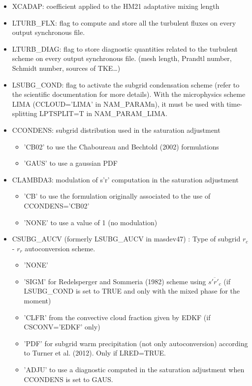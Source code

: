 \begin{itemize}
\item
{} 
XCADAP: coefficient applied to the HM21 adaptative mixing length

\item
{}
LTURB\_FLX: flag to compute and store all the turbulent fluxes
 on every output synchronous file.

\item
{}
LTURB\_DIAG: flag to  store diagnostic quantities related to the 
turbulent scheme  on every output synchronous file. (mesh length, Prandtl
number, Schmidt number, sources of TKE\ldots)

\item
{}
LSUBG\_COND: flag to activate the subgrid condensation scheme (refer to the scientific 
documentation for more details).  With the microphysics scheme LIMA (CCLOUD='LIMA' in NAM\_PARAMn), it must be used with time-splitting LPTSPLIT=T in NAM\_PARAM\_LIMA.

\item
{}
CCONDENS: subgrid distribution used in the saturation adjustment
\begin{itemize}
\item  'CB02' to use the Chaboureau and Bechtold (2002) formulations
\item 'GAUS' to use a gaussian PDF
\end{itemize}

\item
{}
CLAMBDA3: modulation of s'r' computation in the saturation adjustment
\begin{itemize}
\item 'CB' to use the formulation originally associated to the use of CCONDENS='CB02'
\item 'NONE' to use a value of 1 (no modulation)
\end{itemize}

\item
{}
CSUBG\_AUCV (formerly LSUBG\_AUCV in masdev47) : Type of subgrid $r_c$ - $r_r$ autoconversion scheme.
\begin{itemize}
\item  'NONE'
\item 'SIGM' for Redelsperger and Sommeria (1982) scheme using $\overline{s'r'_{c}}$ 
(if LSUBG\_COND
is set to TRUE and only with the mixed phase for the moment)
\item 'CLFR' from the convective cloud fraction given by EDKF 
(if CSCONV='EDKF' only)
\item 'PDF' for subgrid warm precipitation (not only autoconversion) according to Turner et al. (2012). Only if LRED=TRUE.
\item 'ADJU' to use a diagnostic computed in the saturation adjustment when CCONDENS is set to GAUS.
\end{itemize}


\end{itemize}
